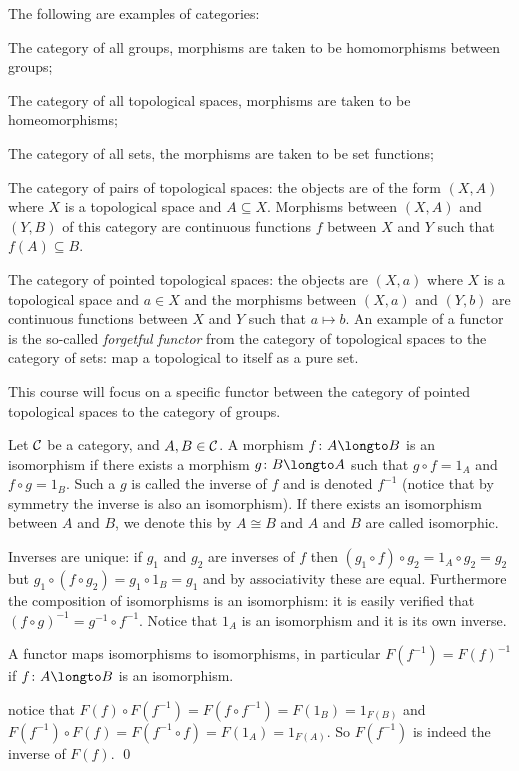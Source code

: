    The following are examples of categories:
    \benum
        \item The category of all groups, morphisms are taken to be homomorphisms between groups;
        \item The category of all topological spaces, morphisms are taken to be homeomorphisms;
        \item The category of all sets, the morphisms are taken to be set functions;
        \item The category of pairs of topological spaces: the objects are of the form $(X,A)$ where $X$ is a topological space and $A\subseteq X$.
            Morphisms between $(X,A)$ and $(Y,B)$ of this category are continuous functions $f$ between $X$ and $Y$ such that $f(A)\subseteq B$.
        \item The category of pointed topological spaces: the objects are $(X,a)$ where $X$ is a topological space and $a\in X$ and the morphisms between $(X,a)$ and $(Y,b)$ are continuous functions between
            $X$ and $Y$ such that $a\mapsto b$.
    \eenum
    An example of a functor is the so-called {\it forgetful functor} from the category of topological spaces to the category of sets: map a topological to itself as a pure set.

\eexam

This course will focus on a specific functor between the category of pointed topological spaces to the category of groups.

\bdefn

    Let ${\cal C}$ be a category, and $A,B\in{\cal C}$.
    A morphism $f\colon A\longto B$ is an {\emphcolor isomorphism} if there exists a morphism $g\colon B\longto A$ such that $g\circ f=1_A$ and $f\circ g=1_B$.
    Such a $g$ is called the {\emphcolor inverse} of $f$ and is denoted $f^{-1}$ (notice that by symmetry the inverse is also an isomorphism).
    If there exists an isomorphism between $A$ and $B$, we denote this by $A\cong B$ and $A$ and $B$ are called {\emphcolor isomorphic}.

\edefn

Inverses are unique: if $g_1$ and $g_2$ are inverses of $f$ then $(g_1\circ f)\circ g_2=1_A\circ g_2=g_2$ but $g_1\circ(f\circ g_2)=g_1\circ 1_B=g_1$ and by associativity these are equal.
Furthermore the composition of isomorphisms is an isomorphism: it is easily verified that $(f\circ g)^{-1}=g^{-1}\circ f^{-1}$.
Notice that $1_A$ is an isomorphism and it is its own inverse.

\bprop

    A functor maps isomorphisms to isomorphisms, in particular $F(f^{-1})=F(f)^{-1}$ if $f\colon A\longto B$ is an isomorphism.

\eprop

\Proof notice that $F(f)\circ F(f^{-1})=F(f\circ f^{-1})=F(1_B)=1_{F(B)}$ and $F(f^{-1})\circ F(f)=F(f^{-1}\circ f)=F(1_A)=1_{F(A)}$.
So $F(f^{-1})$ is indeed the inverse of $F(f)$.
\qed


